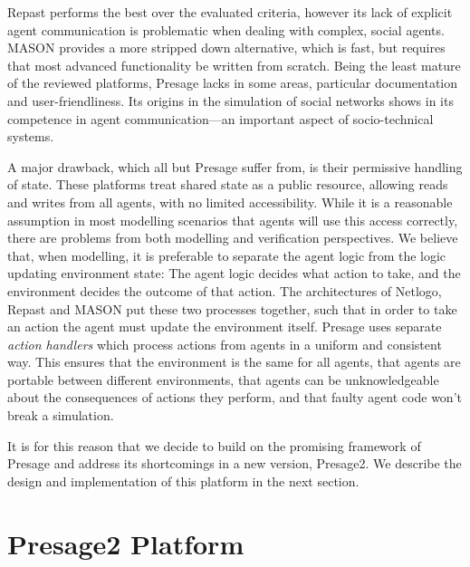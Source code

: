 Repast performs the best over the evaluated criteria, however its lack of
explicit agent communication is problematic when dealing with complex, social
agents. MASON provides a more stripped down alternative, which is fast, but
requires that most advanced functionality be written from scratch. Being the
least mature of the reviewed platforms, Presage lacks in some areas,
particular documentation and user-friendliness. Its origins in the simulation
of social networks shows in its competence in agent communication---an
important aspect of socio-technical systems.

A major drawback, which all but Presage suffer from, is their permissive
handling of state. These platforms treat shared state as a public resource,
allowing reads and writes from all agents, with no limited accessibility.
While it is a reasonable assumption in most modelling scenarios that agents
will use this access correctly, there are problems from both modelling and
verification perspectives. We believe that, when modelling, it is preferable
to separate the agent logic from the logic updating environment state: The
agent logic decides what action to take, and the environment decides the
outcome of that action. The architectures of Netlogo, Repast and MASON put
these two processes together, such that in order to take an action the agent
must update the environment itself. Presage uses separate \emph{action
handlers} which process actions from agents in a uniform and consistent way.
This ensures that the environment is the same for all agents, that agents are
portable between different environments, that agents can be unknowledgeable
about the consequences of actions they perform, and that faulty agent code
won't break a simulation.

It is for this reason that we decide to build on the promising  framework of Presage and address its shortcomings in a new version, Presage2. We describe the design and implementation of this platform in the next section.




\section{Presage2 Platform}

